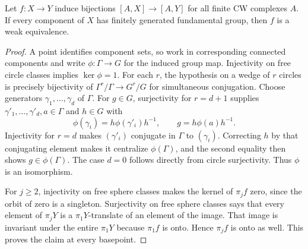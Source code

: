 \begin{lemma}
\label{CD:anchoring}
Let $f:X\to Y$ induce bijections $[A,X]\to[A,Y]$ for all finite CW
complexes $A$.  If every component of $X$ has finitely generated
fundamental group, then $f$ is a weak equivalence.
\end{lemma}
\begin{proof}
A point identifies component sets, so work in corresponding connected
components and write $\phi:\Gamma\to G$ for the induced group map.
Injectivity on free circle classes implies $\ker\phi=1$.
For each $r$, the hypothesis on a wedge of $r$ circles is precisely
bijectivity of $\Gamma^r/\Gamma\to G^r/G$ for simultaneous conjugation.
Choose generators $\gamma_1,\ldots,\gamma_d$ of $\Gamma$.
For $g\in G$, surjectivity for $r=d+1$ supplies
$\gamma'_1,\ldots,\gamma'_d,a\in\Gamma$ and $h\in G$ with
\[
 \phi(\gamma_i)=h\phi(\gamma'_i)h^{-1},\qquad
 g=h\phi(a)h^{-1}.
\]
Injectivity for $r=d$ makes $(\gamma'_i)$ conjugate in $\Gamma$ to
$(\gamma_i)$.  Correcting $h$ by that conjugating element makes it
centralize $\phi(\Gamma)$, and the second equality then shows
$g\in\phi(\Gamma)$.  The case $d=0$ follows directly from circle
surjectivity.  Thus $\phi$ is an isomorphism.

For $j\ge2$, injectivity on free sphere classes makes the kernel of
$\pi_jf$ zero, since the orbit of zero is a singleton.  Surjectivity on
free sphere classes says that every element of $\pi_jY$ is a
$\pi_1Y$-translate of an element of the image.  That image is invariant
under the entire $\pi_1Y$ because $\pi_1f$ is onto.  Hence $\pi_jf$
is onto as well.  This proves the claim at every basepoint.
\end{proof}

